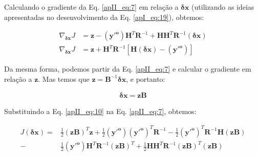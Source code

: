 Calculando o gradiente da Eq. \ref{apII_eq:7} em relação a $\mathbf{\delta{x}}$ (utilizando as ideias apresentadas no desenvolvimento da Eq. \ref{apI_eq:19}), obtemos:



\begin{align}
\label{apII_eq:8}
\nabla_{\mathbf{\delta{x}}}J & = \mathbf{z} - (\mathbf{y'^o})\mathbf{H}^{T}\mathbf{R}^{-1} + \mathbf{H}\mathbf{H}^{T}\mathbf{R}^{-1}(\mathbf{\delta{x}}) \\
\label{apII_eq:9}
\nabla_{\mathbf{\delta{x}}}J & = \mathbf{z} + \mathbf{H}^{T}\mathbf{R}^{-1}[
\mathbf{H}(\mathbf{\delta{x}}) - (\mathbf{y'^o})]
\end{align}

Da mesma forma, podemos partir da Eq. \ref{apII_eq:7} e calcular o gradiente em relação a $\mathbf{z}$. Mas temos que $\mathbf{z} = \mathbf{B}^{-1}\mathbf{\delta{x}}$, e portanto:

\begin{equation}
\label{apII_eq:10}
  \begin{split}
\mathbf{\delta{x}} = \mathbf{z}\mathbf{B}
  \end{split}
\end{equation}

Substituindo a Eq. \ref{apII_eq:10} na Eq. \ref{apII_eq:7}, obtemos:

\begin{equation}
\label{apII_eq:11}
  \begin{aligned}
J(\mathbf{\delta{x}}) = {} & \frac{1}{2}(\mathbf{z}\mathbf{B})^{T}\mathbf{z} + 
\frac{1}{2}(\mathbf{y'^o})(\mathbf{y'^o})^{T}\mathbf{R}^{-1} -
\frac{1}{2}(\mathbf{y'^o})^{T}\mathbf{R}^{-1}\mathbf{H}(\mathbf{z}\mathbf{B}) \\ - 
& \frac{1}{2}(\mathbf{y'^o})\mathbf{H}^{T}\mathbf{R}^{-1}(\mathbf{z}\mathbf{B})^{T} +
\frac{1}{2}\mathbf{H}\mathbf{H}^{T}\mathbf{R}^{-1}(\mathbf{z}\mathbf{B})^{T}(\mathbf{z}\mathbf{B})
  \end{aligned}
\end{equation}

